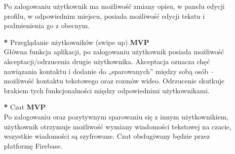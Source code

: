 \documentclass[12pt,a4paper]{article}
\begin{document}
\begin{itemize}
\newline
Po zalogowaniu użytkownik ma możliwość zmiany opisu, w panelu edycji profilu, w odpowiednim miejscu, posiada możliwość edycji tekstu i podmienienia go z obecnym.
\newline
\item [\textbf{*}] Przeglądanie użytkowników (swipe up) \textbf{MVP}
\\ 
\newline
Główna funkcja aplikacji, po zalogowaniu użytkownik posiada możliwość akceptacji/odrzucenia drugie użytkownika. Akceptacja oznacza chęć nawiązania kontaktu i dodanie do „sparowanych” między sobą osób – możliwość kontaktu tekstowego oraz rozmów wideo. Odrzucenie skutkuje brakiem tych funkcjonalności między odpowiednimi użytkownikami.
\newline
\item [\textbf{*}] Czat \textbf{MVP}
\\ 
\newline
Po zalogowaniu oraz pozytywnym sparowaniu się z innym użytkownikiem, użytkownik otrzymuje możliwość wymiany wiadomości tekstowej na czacie, wszystkie wiadomości są szyfrowane.  Czat obsługiwany będzie przez  platformę Firebase.
\newline


\end{itemize}
\end{document}
